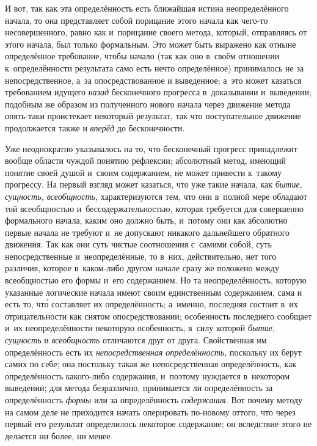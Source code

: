 И вот, так как эта определённость есть ближайшая истина
неопределённого начала, то она представляет собой порицание этого начала
как чего-то несовершенного, равно как и~порицание своего метода, который,
отправляясь от этого начала, был только формальным. Это может быть выражено
как отныне определённое требование, чтобы начало (так как оно в~своём
отношении к~определённости результата само есть нечто определённое)
принималось не за непосредственное, а~за опосредствованное и
выведенное; а~это может казаться требованием идущего
{\em назад} бесконечного
прогресса в~доказывании и~выведении; подобным же образом из полученного
нового начала через движение метода опять-таки проистекает некоторый
результат, так что поступательное движение продолжается также и
{\em вперёд} до бесконечности.

Уже неоднократно указывалось на то, что бесконечный прогресс
принадлежит вообще области чуждой понятию рефлексии; абсолютный метод,
имеющий понятие своей душой и~своим содержанием, не может привести к~такому
прогрессу. На первый взгляд может казаться, что уже такие начала, как
{\em бытие, сущность, всеобщность,}
характеризуются тем, что они в~полной мере обладают той
всеобщностью и~бессодержательностью, которая требуется для совершенно
формального начала, каким оно должно быть, и~потому они как абсолютно
первые начала не требуют и~не допускают никакого дальнейшего обратного
движения. Так как они суть чистые соотношения с~самими собой, суть
непосредственные и~неопределённые, то в~них, действительно, нет того
различия, которое в~каком-либо другом начале сразу же положено между
всеобщностью его формы и~его содержанием. Но та неопределённость, которую
указанные логические начала имеют своим единственным содержанием, сама и
есть то, чт\'{о} составляет их определённость; а~именно, последняя состоит в~их
отрицательности как снятом опосредствовании; особенность последнего
сообщает и~их неопределённости некоторую особенность, в~силу которой
{\em бытие, сущность} и {\em всеобщность}
отличаются друг от друга. Свойственная им определённость есть
их {\em непосредственная
определённость,} поскольку их берут самих по себе; она
постольку такая же непосредственная определённость, как определённость
какого-либо содержания, и~поэтому нуждается в~некотором выведении; для
метода безразлично, принимается ли определённость за определённость
{\em формы} или за определённость {\em содержания}.
Вот почему методу на самом деле не приходится начать
оперировать по-новому оттого, что через первый его результат определилось
некоторое содержание; он вследствие этого не делается ни более, ни менее
